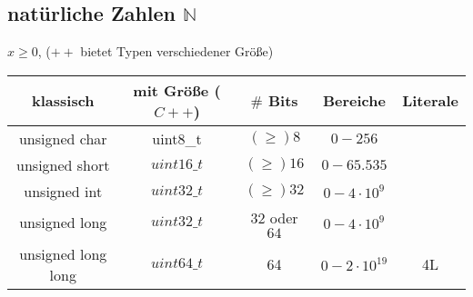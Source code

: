 \documentclass{article}
\begin{document}
\subsection{natürliche Zahlen $\mathbb{N}$}
	$x \geq 0$, ($++$ bietet Typen verschiedener Größe) \\

	\begin{tabular} {c|c|c|c|c}
		klassisch & mit Größe ($C++$) & $\#$ Bits & Bereiche & Literale \\ \hline
		unsigned char & uint8\_t & $(\geq) 8$ & $0-256$ & \\
		unsigned short & $uint16\_t$ & $(\geq) 16$ & $0-65.535$ & \\
		unsigned int & $uint32\_t$ & $(\geq) 32$ & $0-4\cdot 10^9$ & \\
		unsigned long & $uint32\_t$ & $32$ oder $64$ & $0-4\cdot 10^9$ & \\
		unsigned long long & $uint64\_t$ & 64 & $0-2\cdot 10^{19}$ & 4L \\
	\end{tabular}
	
\end{document}
